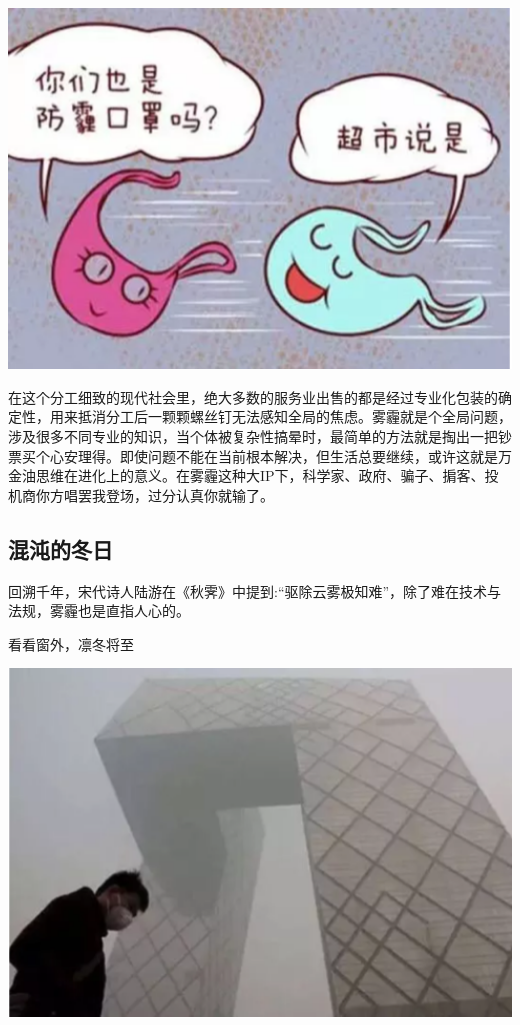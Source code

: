 \documentclass[]{book}
\begin{document}
\includegraphics[width=6.67in]{images/cw4}

在这个分工细致的现代社会里，绝大多数的服务业出售的都是经过专业化包装的确定性，用来抵消分工后一颗颗螺丝钉无法感知全局的焦虑。雾霾就是个全局问题，涉及很多不同专业的知识，当个体被复杂性搞晕时，最简单的方法就是掏出一把钞票买个心安理得。即使问题不能在当前根本解决，但生活总要继续，或许这就是万金油思维在进化上的意义。在雾霾这种大IP下，科学家、政府、骗子、掮客、投机商你方唱罢我登场，过分认真你就输了。

\hypertarget{ux6df7ux6c8cux7684ux51acux65e5-1}{%
\subsection{混沌的冬日}\label{ux6df7ux6c8cux7684ux51acux65e5-1}}

回溯千年，宋代诗人陆游在《秋霁》中提到:``驱除云雾极知难''，除了难在技术与法规，雾霾也是直指人心的。

看看窗外，凛冬将至

\includegraphics[width=6.67in]{images/cw5}
\end{document}

